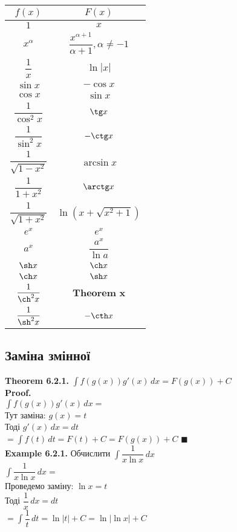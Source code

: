 \documentclass[a4paper, 14pt]{extarticle}
\def\huge{\displaystyle}
\def\bigline{\vspace{5mm}\\}
\def\ex#1{\textbf{Example {#1}}}
\def\th#1{\textbf{Theorem {#1}}}
\def\proof{\textbf{Proof.}\\}
\def\bigline{\vspace{5mm}\\}
\def\qed{$\blacksquare$}
\begin{document}
\begin{center}
\begin{tabular}{ c|c } 
 $f(x)$ & $F(x)$ \\
 \hline 
 $1$ & $x$ \\ [2ex]
 \hline 
 $x^\alpha$ & $\dfrac{x^{\alpha+1}}{\alpha+1}, \alpha \neq -1$ \\ [2ex]
 \hline
 $\dfrac{1}{x}$ & $\ln |x|$ \\ [2ex]
 \hline
 $\sin x$ & $-\cos x$\\ [2ex]
 \hline 
 $\cos x$ & $\sin x$\\ [2ex]
 \hline
 $\dfrac{1}{\cos^2 x}$ & $\tg x$\\ [2ex]
 \hline 
 $\dfrac{1}{\sin^2 x}$ & $-\ctg x$\\ [2ex]
 \hline
 $\dfrac{1}{\sqrt{1-x^2}}$ & $\arcsin x$\\ [2ex]
 \hline
 $\dfrac{1}{1+x^2}$ & $\arctg x$\\ [2ex]
 \hline
 $\dfrac{1}{\sqrt{1+x^2}}$ & $\ln(x+\sqrt{x^2+1})$\\ [2ex]
 \hline
 $e^x$ & $e^x$ \\ [2ex]
 \hline 
 $a^x$ & $\dfrac{a^x}{\ln a}$ \\ [2ex]
 \hline
 $\sh x$ & $\ch x$ \\ [2ex]
 \hline
 $\ch x$ & $\sh x$ \\ [2ex]
 \hline
 $\dfrac{1}{\ch^2 x}$ & $\th x$\\ [2ex]
 \hline
 $\dfrac{1}{\sh^2 x}$ & $-\cth x$\\
\end{tabular}
\end{center}

\subsection{Заміна змінної}
\th{6.2.1.} $\huge \int f(g(x)) g'(x)\,dx = F(g(x)) + C$\\
\proof
$\huge \int f(g(x))g'(x)\,dx =$\\
Тут заміна: $g(x) = t$\\
Тоді $g'(x)\,dx = dt$\\
$= \huge \int f(t)\,dt = F(t) + C = F(g(x)) + C$ \qed
\bigline
\ex{6.2.1.} Обчислити $\huge \int \dfrac{1}{x \ln x} \,dx$\\
$\huge \int \dfrac{1}{x \ln x} \,dx = $\\
Проведемо заміну: $\ln x = t$\\
Тоді $\dfrac{1}{x}\,dx = dt$\\
$= \huge \int \dfrac{1}{t}\,dt = \ln |t| + C = \ln |\ln x| + C$
\bigline
\end{document}
